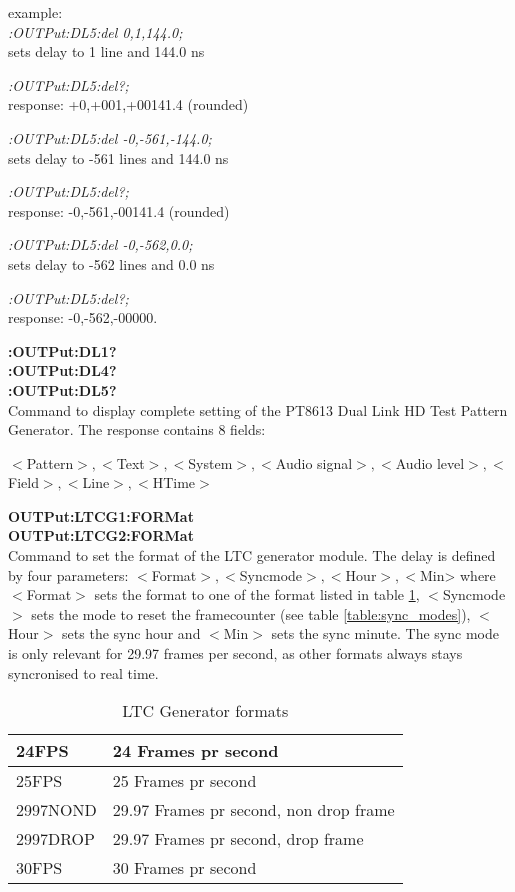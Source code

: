 example:\\
\textit{:OUTPut:DL5:del 0,1,144.0;}\\
sets delay to 1 line and 144.0 ns

\textit{:OUTPut:DL5:del?;}\\           
response: +0,+001,+00141.4 (rounded)

\textit{:OUTPut:DL5:del -0,-561,-144.0;}\\
sets delay to -561 lines and 144.0 ns

\textit{:OUTPut:DL5:del?; }\\ 
response: -0,-561,-00141.4 (rounded)

\textit{:OUTPut:DL5:del -0,-562,0.0;}\\
sets delay to -562 lines and 0.0 ns

\textit{:OUTPut:DL5:del?;}\\  
response: -0,-562,-00000.

\textbf{:OUTPut:DL1?}\\
\textbf{:OUTPut:DL4?}\\
\textbf{:OUTPut:DL5?}\\

Command to display complete setting of the PT8613 Dual Link HD Test Pattern Generator.  The response contains 8 fields:

$<$Pattern$>,<$Text$>,<$System$>,<$Audio signal$>,<$Audio level$>,<$Field$>,<$Line$>,<$HTime$>$



\textbf{OUTPut:LTCG1:FORMat}\\
\textbf{OUTPut:LTCG2:FORMat}\\
Command to set the format of the LTC generator module. The delay is defined by four parameters: $<$Format$>,<$Syncmode$>,<$Hour$>,<$Min>
where $<$Format$>$ sets the format to one of the format listed in table \ref{table:LTC_formats}, $<$Syncmode$>$ sets the mode to reset the framecounter (see table \ref{table:sync_modes}), $<$Hour$>$ sets the sync hour and $<$Min$>$ sets the sync minute. The sync mode is only relevant for 29.97 frames per second, as other formats always stays syncronised to real time.

\begin{table}[hbt]
\centering

\begin{tabular}{|l|l|}
\hline
24FPS	& 24 Frames pr second \\ \hline
25FPS	&	25 Frames pr second \\ \hline
2997NOND & 29.97 Frames pr second, non drop frame \\ \hline
2997DROP & 29.97 Frames pr second, drop frame \\ \hline
30FPS & 30 Frames pr second \\ \hline
\end{tabular}

\caption{LTC Generator formats}
\label{table:LTC_formats}

\end{table}

